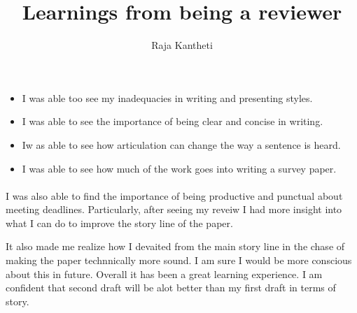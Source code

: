\documentclass[10pt]{article}
\title{Learnings from being a reviewer}
\author{Raja Kantheti}
\begin{document}
\maketitle

\begin{itemize}
    \item I was able too see my inadequacies in writing and presenting styles. 
    \item I was able to see the importance of being clear and concise in writing.
    \item Iw as able to see how articulation can change the way a sentence is heard. 
    \item I was able to see how much of the work goes into writing a survey paper.
\end{itemize}
\paragraph{} I was also able to find the importance of being productive and punctual about meeting deadlines. Particularly, after seeing my reveiw
I had more insight into what I can do to improve the story line of the paper. 

It also made me realize how I devaited from the main story line in the chase of making the paper technnically more sound. I am sure I would be more conscious about this in future.
Overall it has been a great learning experience. I am confident that second draft will be alot better than my first draft in terms of story.
\end{document}
